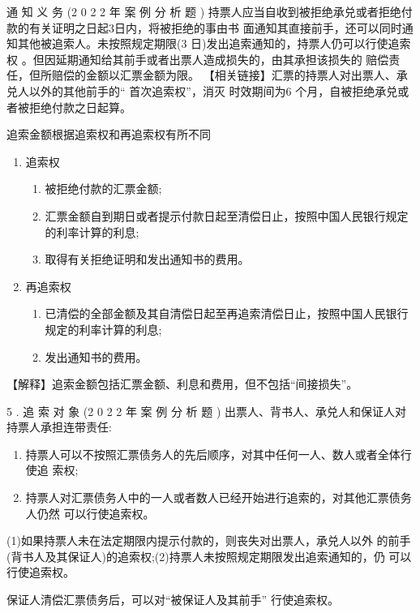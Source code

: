 \documentclass[UTF8,12pt]{ctexart}
\numberwithin{equation}{section} %
\numberwithin{figure}{section}
\numberwithin{table}{section}
\begin{document}
	通 知 义 务 (2 0 2 2 年 案 例 分 析 题 ) 
	持票人应当自收到被拒绝承兑或者拒绝付款的有关证明之日起3日内，将被拒绝的事由书 面通知其直接前手，还可以同时通知其他被追索人。未按照规定期限(3 日)发出追索通知的，持票人仍可以行使追索权 。但因延期通知给其前手或者出票人造成损失的，由其承担该损失的 赔偿责任，但所赔偿的金额以汇票金额为限。
	【相关链接】汇票的持票人对出票人、承兑人以外的其他前手的“ 首次追索权”，消灭 时效期间为6 个月，自被拒绝承兑或者被拒绝付款之日起算。
	
	追索金额根据追索权和再追索权有所不同
	\begin{enumerate}
		\item 追索权
		\begin{enumerate}
			\item 被拒绝付款的汇票金额; 
			
			\item 汇票金额自到期日或者提示付款日起至清偿日止，按照中国人民银行规定的利率计算的利息;
			
			\item 取得有关拒绝证明和发出通知书的费用。
		\end{enumerate}
		
		\item 再追索权 
		\begin{enumerate}
			\item 已清偿的全部金额及其自清偿日起至再追索清偿日止，按照中国人民银行规定的利率计算的利息;
			
			\item 发出通知书的费用。
		\end{enumerate}
	\end{enumerate}
	【解释】追索金额包括汇票金额、利息和费用，但不包括“间接损失”。
	
	5 . 追 索 对 象 (2 0 2 2 年 案 例 分 析 题 ) 出票人、背书人、承兑人和保证人对持票人承担连带责任: 
	\begin{enumerate}
		\item 持票人可以不按照汇票债务人的先后顺序，对其中任何一人、数人或者全体行使追 索权;
		
		\item 持票人对汇票债务人中的一人或者数人已经开始进行追索的，对其他汇票债务人仍然 可以行使追索权。
	\end{enumerate}
	
	(1)如果持票人未在法定期限内提示付款的，则丧失对出票人，承兑人以外 的前手(背书人及其保证人)的追索权;(2)持票人未按照规定期限发出追索通知的，仍 可以行使追索权。 
	
	保证人清偿汇票债务后，可以对“被保证人及其前手” 行使追索权。 
	
\end{document}
